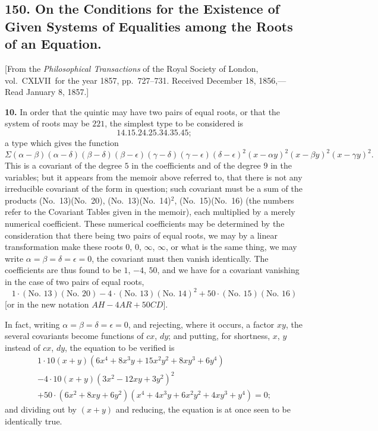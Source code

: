 \documentclass[11pt,a4paper]{book}
\begin{document}
\begin{center}
\newpage


\section*{150. On the Conditions for the Existence of Given Systems of Equalities among the Roots of an Equation.}

[From the \textit{Philosophical Transactions} of the Royal Society of London, vol.~CXLVII\ for the year 1857, pp.~727--731.
Received December 18, 1856,---Read January 8, 1857.]

\bigskip
\noindent\textbf{10.} In order that the quintic may have two pairs of equal roots, or that the system of roots may be $221$, the simplest type to be considered is
\[14.15.24.25.34.35.45;\]
a type which gives the function
\[
\Sigma(\alpha-\beta)(\alpha-\delta)(\beta-\delta)(\beta-\epsilon)(\gamma-\delta)(\gamma-\epsilon)(\delta-\epsilon)^2
(x-\alpha y)^2(x-\beta y)^2(x-\gamma y)^2.
\]
This is a covariant of the degree $5$ in the coefficients and of the degree $9$ in the variables; but it appears from the memoir above referred to, that there is not any irreducible covariant of the form in question; such covariant must be a sum of the products (No.~13)(No.~20), (No.~13)(No.~14)$^2$, (No.~15)(No.~16) (the numbers refer to the Covariant Tables given in the memoir), each multiplied by a merely numerical coefficient. These numerical coefficients may be determined by the consideration that there being two pairs of equal roots, we may by a linear transformation make these roots $0$, $0$, $\infty$, $\infty$, or what is the same thing, we may write $\alpha=\beta=\delta=\epsilon=0$, the covariant must then vanish identically. The coefficients are thus found to be $1$, $-4$, $50$, and we have for a covariant vanishing in the case of two pairs of equal roots,
\[
1 \cdot (\text{No.~13})(\text{No.~20}) - 4 \cdot (\text{No.~13})(\text{No.~14})^2 + 50 \cdot (\text{No.~15})(\text{No.~16})
\]
[or in the new notation $AH - 4AR + 50CD$].

In fact, writing $\alpha=\beta=\delta=\epsilon=0$, and rejecting, where it occurs, a factor $xy$, the several covariants become functions of $cx$, $dy$; and putting, for shortness, $x$, $y$ instead of $cx$, $dy$, the equation to be verified is
\begin{multline*}
1 \cdot 10(x+y)(6x^4 + 8x^3y + 15x^2y^2 + 8xy^3 + 6y^4) \\
- 4 \cdot 10(x+y)(3x^2 - 12xy + 3y^2)^2 \\
+ 50 \cdot (6x^2 + 8xy + 6y^2)(x^4 + 4x^3y + 6x^2y^2 + 4xy^3 + y^4) = 0;
\end{multline*}
and dividing out by $(x+y)$ and reducing, the equation is at once seen to be identically true.


\end{center}
\end{document}
